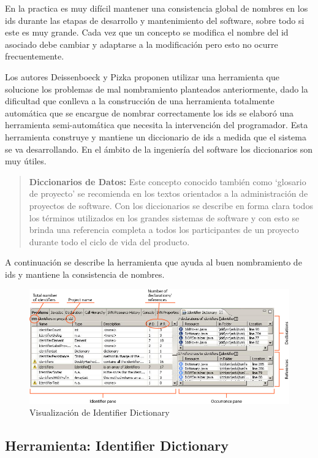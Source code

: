 \documentclass[a4paper,12pt]{report}
\begin{document}
En la practica es muy difícil mantener una consistencia global de nombres en los ids durante las etapas de desarrollo y mantenimiento del software, sobre todo si este es muy grande. Cada vez que un concepto se modifica el nombre del id asociado debe cambiar y adaptarse a la modificación pero esto no ocurre frecuentemente.

Los autores Deissenboeck y Pizka\cite{DFPM05} proponen utilizar una herramienta que solucione los problemas de mal nombramiento planteados anteriormente, dado la dificultad que conlleva a la construcción de una herramienta totalmente automática que se encargue de nombrar correctamente los ids se elaboró una herramienta semi-automática que necesita la intervención del programador. Esta herramienta construye y mantiene un diccionario de ids a medida que el sistema se va desarrollando. En el ámbito de la ingeniería del software los diccionarios son muy útiles.

\begin{verse}
\textbf{Diccionarios de Datos:} Este concepto conocido también como `glosario de proyecto' se recomienda en los textos orientados a la administración de proyectos de software. Con los diccionarios se describe en forma clara todos los términos utilizados en los grandes sistemas de software y con esto se brinda una referencia completa a todos los participantes de un proyecto durante todo el ciclo de vida del producto.
\end{verse}

A continuación se describe la herramienta que ayuda al buen nombramiento de ids y mantiene la consistencia de nombres.

\begin{figure}[h] %
\centering
\includegraphics[scale= 0.50]{./idd_2.png}
\caption{Visualización de Identifier Dictionary}
\label{captura3}
\end{figure}
\pagebreak
\subsection{Herramienta: Identifier Dictionary}
\end{document}
